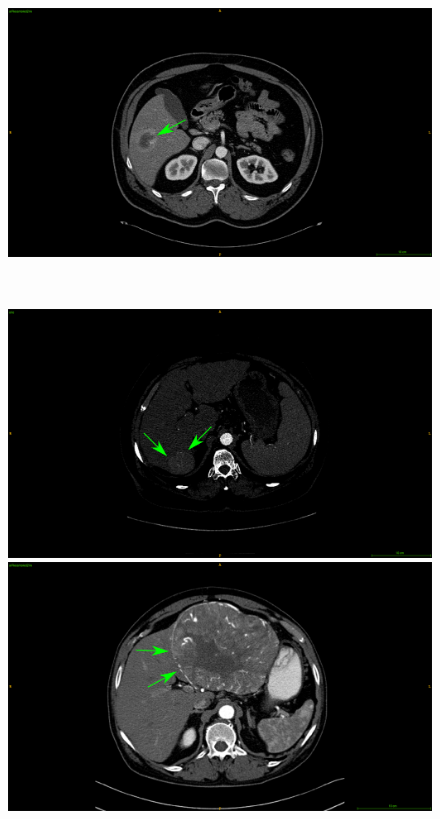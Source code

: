 {\begin{figure}[!ht]
\begin{mdframed}[backgroundcolor=blue!50,linecolor=blue!50]
\begin{minipage}{0.45\linewidth}
			\includegraphics[width=\linewidth]{images/ImagingTraits/ResizeTCIA_peritumoralEnhancement}
		\end{minipage} \\
		\begin{minipage}{0.45\linewidth}
			\includegraphics[width=\linewidth]{images/ImagingTraits/ResizeGDB_smoothMargins}
		\end{minipage} \hspace{-0.1cm}
		\begin{minipage}{0.45\linewidth}
			\includegraphics[width=\linewidth]{images/ImagingTraits/ResizeTCIA_smoothMargins}

\end{minipage}
\end{mdframed}
\end{figure}}
